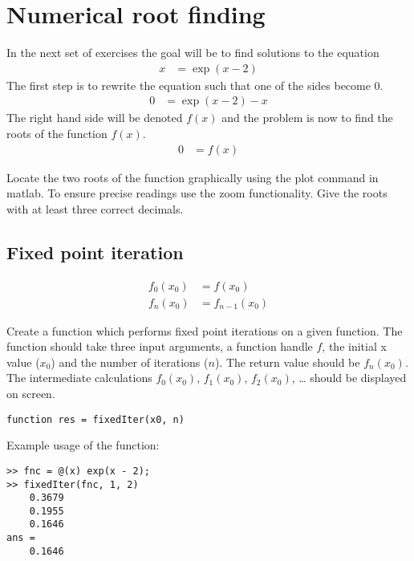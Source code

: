 \section{Numerical root finding}


In the next set of exercises the goal will be to find solutions to the equation
%
\begin{align}
x
	& = \exp(x - 2)
\end{align}
%
The first step is to rewrite the equation such that one of the sides become 0.
%
\begin{align}
0
	& = \exp(x - 2) - x
\end{align}
%
The right hand side will be denoted $f(x)$ and the problem is now to find the 
roots of the function $f(x)$.
\begin{align}
0 & = f(x)
\end{align}

\begin{ex}
Locate the two roots of the function graphically using the plot command in matlab.
To ensure precise readings use the zoom functionality.
Give the roots with at least three correct decimals.
\end{ex}


\subsection{Fixed point iteration}

\begin{align}
f_0(x_0)
	& = f(x_0)	\\
f_n(x_0)
	& = f_{n - 1}(x_0)
\end{align}


\begin{ex}
Create a function which performs fixed point iterations on a given
function.
The function should take three input arguments, a function handle $f$, the initial x value 
($x_0$) and the number of iterations ($n$).
The return value should be $f_n(x_0)$.
The intermediate calculations $f_0(x_0)$, $f_1(x_0)$, $f_2(x_0)$, \ldots 
should be displayed on screen.

\begin{lstlisting}
function res = fixedIter(x0, n)
\end{lstlisting}
Example usage of the function:
\begin{lstlisting}
>> fnc = @(x) exp(x - 2);
>> fixedIter(fnc, 1, 2)
    0.3679
    0.1955
    0.1646
ans =
    0.1646
\end{lstlisting}
\end{ex}

